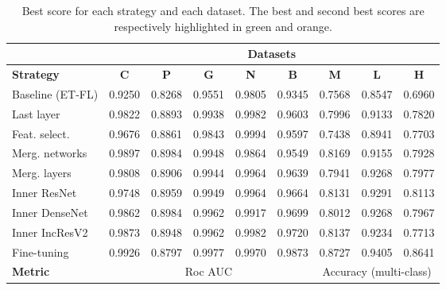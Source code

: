 \begin{table}
    \center
    \small
    \begin{tabular}{|l||c|c|c|c|c||c|c|c|}   
      \hline 
      & \multicolumn{8}{c|}{\textbf{Datasets}} \\
      \hline 
      \textbf{Strategy} & \textbf{C} & \textbf{P} & \textbf{G} & \textbf{N} & \textbf{B} & \textbf{M} & \textbf{L} & \textbf{H} \\
      \hline
      Baseline (ET-FL)      & 0.9250 & 0.8268 & 0.9551 & 0.9805	& 0.9345 & 0.7568 & 0.8547 & 0.6960 \\
      Last layer    & 0.9822 & 0.8893 & 0.9938 & \cellcolor{Dandelion}0.9982 & 0.9603 & 0.7996 & 0.9133	& 0.7820 \\
      Feat. select.	& 0.9676	& 0.8861	& 0.9843	& \cellcolor{LimeGreen}0.9994	& 0.9597	& 0.7438	& 0.8941	& 0.7703 \\
      Merg. networks	& \cellcolor{Dandelion}0.9897	& \cellcolor{LimeGreen}0.8984	& 0.9948	& 0.9864	& 0.9549	& \cellcolor{Dandelion}0.8169	& 0.9155	& 0.7928 \\
      Merg. layers	& 0.9808	& 0.8906	& 0.9944	& 0.9964	& 0.9639	& 0.7941	& 0.9268	& 0.7977 \\
      Inner ResNet	& 0.9748	& \cellcolor{Dandelion}0.8959	& 0.9949	& 0.9964	& 0.9664	& 0.8131	& \cellcolor{Dandelion}0.9291	& \cellcolor{Dandelion}0.8113 \\
      Inner DenseNet	& 0.9862	& \cellcolor{LimeGreen}0.8984	& \cellcolor{Dandelion}0.9962	& 0.9917	& 0.9699	& 0.8012	& 0.9268	& 0.7967 \\
      Inner IncResV2	& 0.9873	& 0.8948	& \cellcolor{Dandelion}0.9962	& \cellcolor{Dandelion}0.9982	& \cellcolor{Dandelion}0.9720	& 0.8137	& 0.9234	& 0.7713 \\
       Fine-tuning		& \cellcolor{LimeGreen}0.9926	& 0.8797	& \cellcolor{LimeGreen}0.9977	& 0.9970	& \cellcolor{LimeGreen}0.9873	& \cellcolor{LimeGreen}0.8727	& \cellcolor{LimeGreen}0.9405	& \cellcolor{LimeGreen}0.8641 \\
      \hline
      \textbf{Metric} & \multicolumn{5}{c||}{Roc AUC} & \multicolumn{3}{c|}{Accuracy (multi-class)} \\
      \hline
    \end{tabular}
      \caption{Best score for each strategy and each dataset. The best and second best scores are respectively highlighted in green and orange.}
    \label{tab:comp:res_best_scores_per_strategy}
\end{table}



